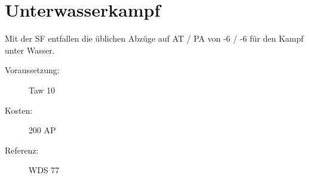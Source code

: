 \section{Unterwasserkampf}
\label{sf.unterwasserkampf}
Mit der SF  entfallen die üblichen Abzüge auf AT / PA von -6 / -6 für den Kampf unter Wasser.
\begin{description}
    \item[Voraussetzung:]
        Taw  10
    \item [Kosten:]
        200 AP
    \item [Referenz:]
        WDS 77
\end{description}
